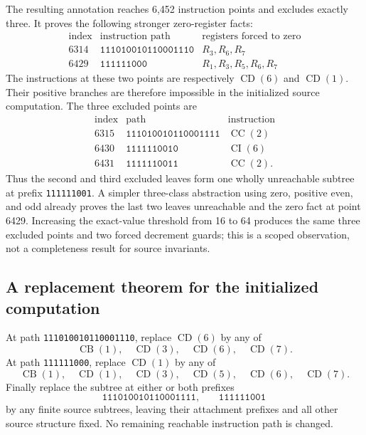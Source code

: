 The resulting annotation reaches 6,452 instruction points and excludes exactly
three.  It proves the following stronger zero-register facts:
\[
\begin{array}{c|l|l}
\text{index}&\text{instruction path}&\text{registers forced to zero}\\\hline
6314&\texttt{111010010110001110}&R_3,R_6,R_7\\
6429&\texttt{111111000}&R_1,R_3,R_5,R_6,R_7
\end{array}
\]
The instructions at these two points are respectively $\operatorname{CD}(6)$
and $\operatorname{CD}(1)$.  Their positive branches are therefore impossible
in the initialized source computation.  The three excluded points are
\[
\begin{array}{c|l|l}
\text{index}&\text{path}&\text{instruction}\\\hline
6315&\texttt{111010010110001111}&\operatorname{CC}(2)\\
6430&\texttt{1111110010}&\operatorname{CI}(6)\\
6431&\texttt{1111110011}&\operatorname{CC}(2).
\end{array}
\]
Thus the second and third excluded leaves form one wholly unreachable subtree
at prefix \texttt{111111001}.  A simpler three-class abstraction using zero,
positive even, and odd already proves the last two leaves unreachable and the
zero fact at point 6429.  Increasing the exact-value threshold from 16 to 64
produces the same three excluded points and two forced decrement guards; this
is a scoped observation, not a completeness result for source invariants.

\subsection{A replacement theorem for the initialized computation}

At path \texttt{111010010110001110}, replace $\operatorname{CD}(6)$ by any of
\[
\operatorname{CB}(1),\quad
\operatorname{CD}(3),\quad \operatorname{CD}(6),\quad \operatorname{CD}(7).
\]
At path \texttt{111111000}, replace $\operatorname{CD}(1)$ by any of
\[
\operatorname{CB}(1),\quad
\operatorname{CD}(1),\quad \operatorname{CD}(3),\quad
\operatorname{CD}(5),\quad \operatorname{CD}(6),\quad \operatorname{CD}(7).
\]
Finally replace the subtree at either or both prefixes
\[
\texttt{111010010110001111},\qquad \texttt{111111001}
\]
by any finite source subtrees, leaving their attachment prefixes and all other
source structure fixed.  No remaining reachable instruction path is changed.

